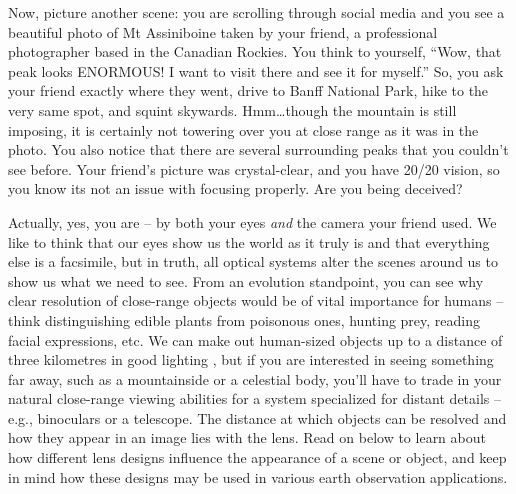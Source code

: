 \documentclass[
]{book}
\begin{document}
Now, picture another scene: you are scrolling through social media and you see a beautiful photo of Mt Assiniboine taken by your friend, a professional photographer based in the Canadian Rockies. You think to yourself, ``Wow, that peak looks ENORMOUS! I want to visit there and see it for myself.'' So, you ask your friend exactly where they went, drive to Banff National Park, hike to the very same spot, and squint skywards. Hmm\ldots though the mountain is still imposing, it is certainly not towering over you at close range as it was in the photo. You also notice that there are several surrounding peaks that you couldn't see before. Your friend's picture was crystal-clear, and you have 20/20 vision, so you know its not an issue with focusing properly. Are you being deceived?

Actually, yes, you are -- by both your eyes \emph{and} the camera your friend used. We like to think that our eyes show us the world as it truly is and that everything else is a facsimile, but in truth, all optical systems alter the scenes around us to show us what we need to see. From an evolution standpoint, you can see why clear resolution of close-range objects would be of vital importance for humans -- think distinguishing edible plants from poisonous ones, hunting prey, reading facial expressions, etc. We can make out human-sized objects up to a distance of three kilometres in good lighting \citep{wolchover_how_2012}, but if you are interested in seeing something far away, such as a mountainside or a celestial body, you'll have to trade in your natural close-range viewing abilities for a system specialized for distant details -- e.g., binoculars or a telescope. The distance at which objects can be resolved and how they appear in an image lies with the lens. Read on below to learn about how different lens designs influence the appearance of a scene or object, and keep in mind how these designs may be used in various earth observation applications.
\end{document}
